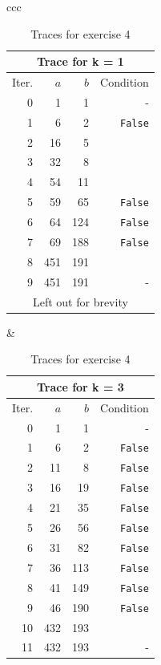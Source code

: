 \begin{table}[htbp]

\begingroup
	\newcommand\header[1]{
	\hline
		\tabletitle{Trace for k = #1} \\
	\hline
		Iter. & $a$  & $b$ & Condition \\
	\hline}
\caption{Traces for exercise 4}
\label{tab:exercise4-traces}
\def\false{ \texttt{False} }
\def\true{\text{True}}
	\def\tabletitle #1{\multicolumn{4}{c}{\cellcolor{black}\color{white}#1}}
\centering
\begin{tabular}{ccc}

	\begin{tabular}[t]{|rrrr|}
	\header{1}
		0 	  & 1         & 1         & - \\
		1 	  & 6         & 2         & \false \\
		2 	  & 16        & 5         & \true \\
		3 	  & 32        & 8         & \true \\
		4 	  & 54        & 11        & \true \\
		5 	  & 59        & 65        & \false\\
		6 	  & 64        & 124       & \false \\
		7 	  & 69        & 188       & \false \\
		8 	  & 451       & 191       & \true \\
		9 	  & 451       & 191       & - \\
		\multicolumn{4}{|c|}{Left out for brevity} \\
	\hline
	\end{tabular}
	&
	\begin{tabular}[t]{|rrrr|}
	\header{3}
		0  	  & 1    & 1   & -\\
		1  	  & 6    & 2   & \false \\
		2  	  & 11   & 8   & \false \\
		3  	  & 16   & 19  & \false \\
		4  	  & 21   & 35  & \false \\
		5  	  & 26   & 56  & \false \\
		6  	  & 31   & 82  & \false \\
		7  	  & 36   & 113 & \false \\
		8  	  & 41   & 149 & \false \\
		9  	  & 46   & 190 & \false \\
		10 	  & 432  & 193 & \true \\
		11 	  & 432  & 193 & - \\

\end{tabular}
\end{tabular}
\end{table}
